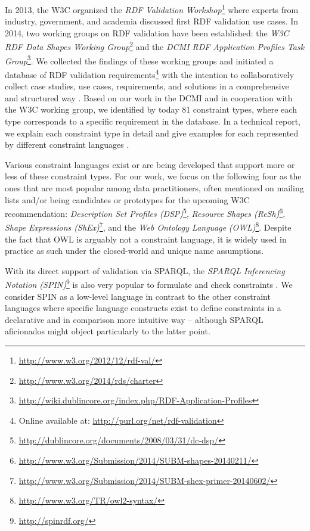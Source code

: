 \documentclass[a4paper,fontsize=11pt]{scrartcl}
\begin{document}
In 2013, the W3C organized the \emph{RDF Validation Workshop}\footnote{\url{http://www.w3.org/2012/12/rdf-val/}}
where experts from industry, government, and academia discussed first RDF validation use cases. 
In 2014, two working groups on RDF validation have been established: 
the \emph{W3C RDF Data Shapes Working Group}\footnote{\url{http://www.w3.org/2014/rds/charter}} and the \emph{DCMI RDF Application Profiles Task Group}\footnote{\url{http://wiki.dublincore.org/index.php/RDF-Application-Profiles}}. 
We collected the findings of these working groups and initiated a database of RDF validation requirements\footnote{Online available at: \url{http://purl.org/net/rdf-validation}}
with the intention to collaboratively collect case studies, use cases, requirements, and solutions in a comprehensive and structured way \cite{BoschEckert2014}. 
Based on our work in the DCMI and in cooperation with the W3C working group,
we identified by today 81 constraint types, where each type corresponds to a specific requirement in the database. In a technical report, we explain each constraint type in detail and give examples for each represented by different constraint languages \cite{BoschNolleAcarEckert2015}.

Various constraint languages exist or are being developed that support more or less of these constraint types. For our work, we focus on the following four as the ones that are most popular among data practitioners, often mentioned on mailing lists and/or being candidates or prototypes for the upcoming W3C recommendation:
\emph{Description Set Profiles (DSP)}\footnote{\url{http://dublincore.org/documents/2008/03/31/dc-dsp/}}, \emph{Resource Shapes (ReSh)}\footnote{\url{http://www.w3.org/Submission/2014/SUBM-shapes-20140211/}}, \emph{Shape Expressions (ShEx)}\footnote{\url{http://www.w3.org/Submission/2014/SUBM-shex-primer-20140602/}}, and the \emph{Web Ontology Language} \emph{(OWL)}\footnote{\url{http://www.w3.org/TR/owl2-syntax/}}. Despite the fact that OWL is arguably not a constraint language, it is widely used in practice as such under the closed-world and unique name assumptions.

With its direct support of validation via SPARQL, the \emph{SPARQL Inferencing Notation (SPIN)}\footnote{\url{http://spinrdf.org/}} is also very popular to formulate and check constraints \cite{Fuerber2010}. We consider SPIN as a low-level language in contrast to the other constraint languages where specific language constructs exist to define constraints in a declarative and in comparison more intuitive way -- although SPARQL aficionados might object particularly to the latter point.
\end{document}
